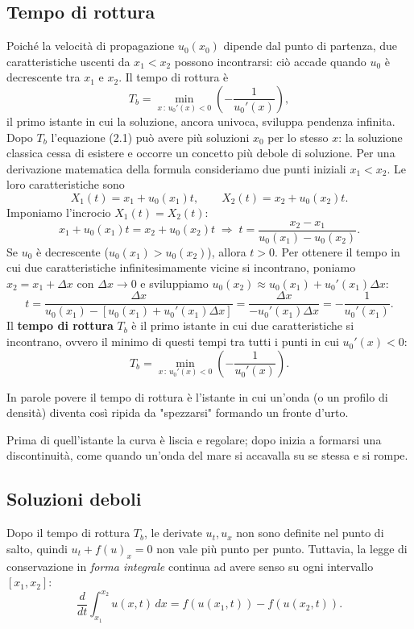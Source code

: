 \documentclass[12pt]{article}
\begin{document}
\subsection{Tempo di rottura}

Poiché la velocità di propagazione $u_0(x_0)$ dipende dal punto di partenza, due caratteristiche uscenti da $x_1<x_2$ possono incontrarsi: ciò accade quando $u_0$ è decrescente tra $x_1$ e $x_2$. Il tempo di rottura è
\[
T_b = \min_{x\,:\,u_0'(x)<0} \left(-\frac{1}{u_0'(x)}\right),
\]
il primo istante in cui la soluzione, ancora univoca, sviluppa pendenza infinita. Dopo $T_b$ l'equazione (2.1) può avere più soluzioni $x_0$ per lo stesso $x$: la soluzione classica cessa di esistere e occorre un concetto più debole di soluzione.
Per una derivazione matematica della formula consideriamo due punti iniziali \(x_1 < x_2\). Le loro caratteristiche sono
\[
X_1(t) = x_1 + u_0(x_1) t, \qquad X_2(t) = x_2 + u_0(x_2) t.
\]
Imponiamo l'incrocio \(X_1(t) = X_2(t)\):
\[
x_1 + u_0(x_1) t = x_2 + u_0(x_2) t
\;\Longrightarrow\;
t = \frac{x_2 - x_1}{u_0(x_1) - u_0(x_2)}.
\]
Se \(u_0\) è decrescente (\(u_0(x_1) > u_0(x_2)\)), allora \(t > 0\). Per ottenere il tempo in cui due caratteristiche infinitesimamente vicine si incontrano, poniamo \(x_2 = x_1 + \Delta x\) con \(\Delta x \to 0\) e sviluppiamo \(u_0(x_2) \approx u_0(x_1) + u_0'(x_1) \Delta x\):
\[
t = \frac{\Delta x}{u_0(x_1) - [u_0(x_1) + u_0'(x_1) \Delta x]} = \frac{\Delta x}{- u_0'(x_1) \Delta x}
= -\frac{1}{u_0'(x_1)}.
\]
Il \textbf{tempo di rottura} \(T_b\) è il primo istante in cui due caratteristiche si incontrano, ovvero il minimo di questi tempi tra tutti i punti in cui \(u_0'(x) < 0\):
\[
T_b = \min_{x \,:\, u_0'(x) < 0} \left( -\frac{1}{u_0'(x)} \right).
\]

In parole povere il tempo di rottura è l'istante in cui un'onda (o un profilo di densità) diventa così ripida da "spezzarsi" formando un fronte d'urto.

Prima di quell'istante la curva è liscia e regolare; dopo inizia a formarsi una discontinuità, come quando un'onda del mare si accavalla su se stessa e si rompe.

\subsection{Soluzioni deboli}

Dopo il tempo di rottura $T_b$, le derivate $u_t, u_x$ non sono definite nel punto di salto,
quindi $u_t+f(u)_x=0$ non vale più punto per punto. Tuttavia, la legge di conservazione
in \emph{forma integrale} continua ad avere senso su ogni intervallo $[x_1,x_2]$:
\[
\frac{d}{dt}\int_{x_1}^{x_2} u(x,t)\,dx = f(u(x_1,t)) - f(u(x_2,t)). \tag{2.2}
\]
\end{document}
